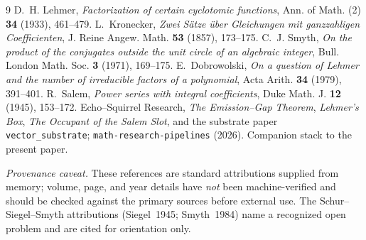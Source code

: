 \documentclass[11pt]{article}
\theoremstyle{plain}
\theoremstyle{definition}
\theoremstyle{remark}
\begin{document}
\begin{thebibliography}{9}
\small
{} D.~H. Lehmer, \emph{Factorization of certain cyclotomic functions}, Ann. of Math.
(2) \textbf{34} (1933), 461--479.
 L.~Kronecker, \emph{Zwei S\"atze \"uber Gleichungen mit ganzzahligen
Coefficienten}, J. Reine Angew. Math. \textbf{53} (1857), 173--175.
 C.~J. Smyth, \emph{On the product of the conjugates outside the unit circle of an
algebraic integer}, Bull. London Math. Soc. \textbf{3} (1971), 169--175.
 E.~Dobrowolski, \emph{On a question of Lehmer and the number of irreducible
factors of a polynomial}, Acta Arith. \textbf{34} (1979), 391--401.
 R.~Salem, \emph{Power series with integral coefficients}, Duke Math. J. \textbf{12}
(1945), 153--172.
 Echo--Squirrel Research, \emph{The Emission--Gap Theorem}, \emph{Lehmer's Box},
\emph{The Occupant of the Salem Slot}, and the substrate paper \texttt{vector\_substrate};
\texttt{math-research-pipelines} (2026). Companion stack to the present paper.
\end{thebibliography}

\smallskip
\noindent\footnotesize\textit{Provenance caveat.} These references are standard attributions
supplied from memory; volume, page, and year details have \emph{not} been machine-verified and
should be checked against the primary sources before external use. The Schur--Siegel--Smyth
attributions (Siegel~1945; Smyth~1984) name a recognized open problem and are cited for
orientation only.
\end{document}
